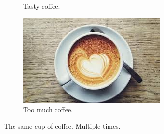 \documentclass{article}
\begin{document}
\begin{figure}[h!]
\begin{subfigure}[b]{0.2\linewidth}
        \caption{Tasty coffee.}
    \end{subfigure}
    \begin{subfigure}[b]{0.5\linewidth}
        \includegraphics[width=\linewidth]{coffee.jpg}
        \caption{Too much coffee.}
    \end{subfigure}
    \caption{The same cup of coffee. Multiple times.}
    \label{fig:coffee3}
\end{figure}
\end{document}

